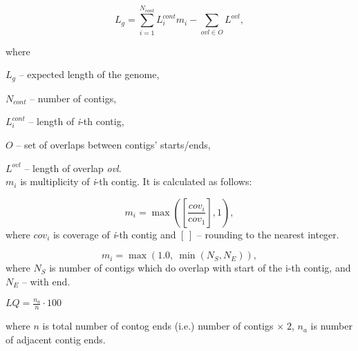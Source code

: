 \documentclass{article}
\begin{document}
	$$L_{g} = \sum_{i=1}^{N_{cont}} L_{i}^{cont} m_{i} - \sum_{ovl \in O} L^{ovl},$$
	
	where
	
	$L_{g}$ -- expected length of the genome,
	
	$N_{cont}$ -- number of contigs,
	
	$L_{i}^{cont}$ -- length of \textit{i}-th contig,
	
	$O$ -- set of overlaps between contigs' starts/ends,
	
	$L^{ovl}$ -- length of overlap \textit{ovl}.\\
	
	$m_{i}$ is multiplicity of \textit{i}-th contig. It is calculated as follows: 
	
	$$m_{i} = \max(\left[\frac{cov_{i}}{cov_{1}}\right], 1),$$  where $cov_{i}$ is coverage of \textit{i}-th contig and $\left[\,\right]$ -- rounding to the nearest integer.

	\newpage

	$$m_{i} = \max(1.0, \: \min(N_{S}, N_{E})),$$  where $N_{S}$ is number of contigs which do overlap with start of the i-th contig, and $N_{E}$ -- with end.

	\newpage
	
	$LQ = \frac{n_{a}}{n} \cdot {100}$
	
where $n$ is total number of contog ends (i.e.) number of contigs $\times\;2$, $n_{a}$ is number of adjacent contig ends. 
	
	
	
\end{document}
